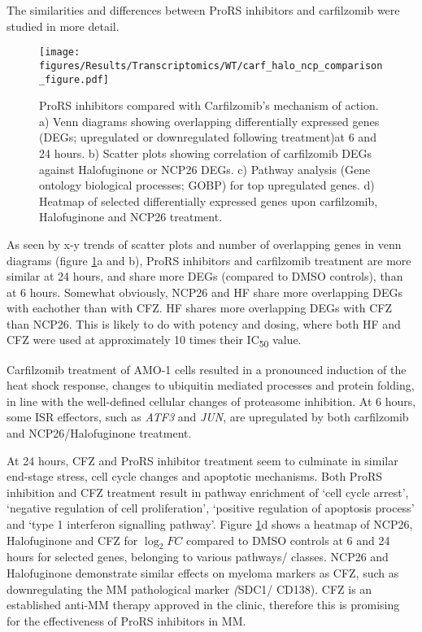 The similarities and differences between ProRS inhibitors and carfilzomib were studied in more detail.
\begin{figure}[p]
\centering
\texttt{[image: figures/Results/Transcriptomics/WT/carf\_halo\_ncp\_comparison\_figure.pdf]}
\caption[ProRS inhibitors compared with Carfilzomib's mechanism of action]{ProRS inhibitors compared with Carfilzomib's mechanism of action.
a) Venn diagrams showing overlapping differentially expressed genes (DEGs; upregulated or downregulated following treatment)at 6 and 24 hours.
b) Scatter plots showing correlation of carfilzomib DEGs against Halofuginone or NCP26 DEGs.
c) Pathway analysis (Gene ontology biological processes; GOBP) for top upregulated genes.
d) Heatmap of selected differentially expressed genes upon carfilzomib, Halofuginone and NCP26 treatment.
}
\label{fig:wt_carf_compare}
\end{figure}
As seen by x-y trends of scatter plots and number of overlapping genes in venn diagrams (figure \ref{fig:wt_carf_compare}a and b), ProRS inhibitors and carfilzomib treatment are more similar at 24 hours, and share more DEGs (compared to DMSO controls), than at 6 hours.
Somewhat obviously, NCP26 and HF share more overlapping DEGs with eachother than with CFZ\@.
HF shares more overlapping DEGs with CFZ than NCP26.
This is likely to do with potency and dosing, where both HF and CFZ were used at approximately 10 times their IC\textsubscript{50} value.

Carfilzomib treatment of AMO-1 cells resulted in a pronounced induction of the heat shock response, changes to ubiquitin mediated processes and protein folding, in line with the well-defined cellular changes of proteasome inhibition.
At 6 hours, some ISR effectors, such as \textit{ATF3} and \textit{JUN}, are upregulated by both carfilzomib and NCP26/Halofuginone treatment.

At 24 hours, CFZ and ProRS inhibitor treatment seem to culminate in similar end-stage stress, cell cycle changes and apoptotic mechanisms.
Both ProRS inhibition and CFZ treatment result in pathway enrichment of `cell cycle arrest', `negative regulation of cell proliferation', `positive regulation of apoptosis process' and `type 1 interferon signalling pathway'.
Figure \ref{fig:wt_carf_compare}d shows a heatmap of NCP26, Halofuginone and CFZ for $\log_{2}FC$ compared to DMSO controls at 6 and 24 hours for selected genes, belonging to various pathways/ classes.
NCP26 and Halofuginone demonstrate similar effects on myeloma markers as CFZ, such as downregulating the MM pathological marker \textit(SDC1/ CD138).
CFZ is an established anti-MM therapy approved in the clinic, therefore this is promising for the effectiveness of ProRS inhibitors in MM.



